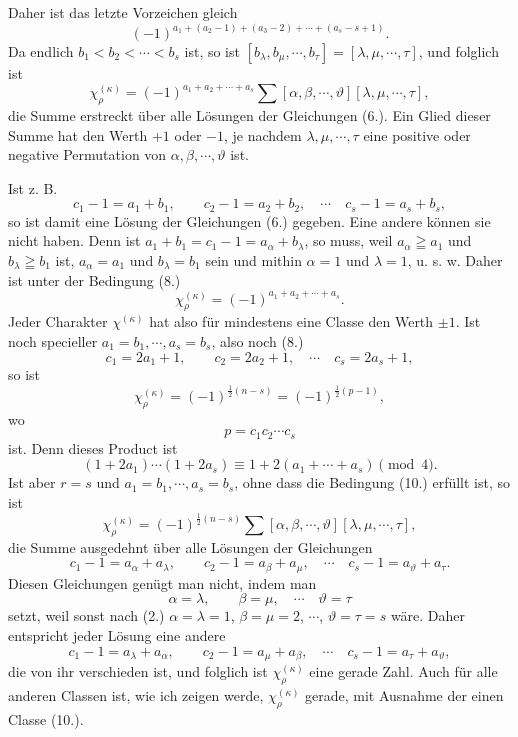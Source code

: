 \documentclass[11pt]{article}
\begin{document}
Daher ist das letzte Vorzeichen gleich
\[
 (-1)^{a_1+(a_2-1)+(a_3-2)+\cdots+(a_s-s+1)}.
\]
Da endlich $b_1<b_2<\cdots<b_s$ ist, so ist $[b_\lambda,b_\mu,
\cdots,b_\tau]=[\lambda,
\mu,
\cdots,
\tau]$, und folglich ist
\begin{equation}\tag{7.}
 \chi_\rho^{(\kappa)}=(-1)^{a_1+a_2+
\cdots+a_s}\sum[\alpha,
\beta,
\cdots,
\vartheta][\lambda,
\mu,
\cdots,
\tau],
\end{equation}
die Summe erstreckt über alle Lösungen der Gleichungen (6.). Ein Glied dieser Summe hat den Werth $+1$ oder $-1$, je nachdem $\lambda,
\mu,
\cdots,
\tau$ eine positive oder negative Permutation von $\alpha,
\beta,
\cdots,
\vartheta$ ist.

Ist z. B.
\begin{equation}\tag{8.}
 c_1-1=a_1+b_1,
\qquad c_2-1=a_2+b_2,
\quad\cdots\quad c_s-1=a_s+b_s,
\end{equation}
so ist damit eine Lösung der Gleichungen (6.) gegeben. Eine andere können sie nicht haben. Denn ist $a_1+b_1=c_1-1=a_\alpha+b_\lambda$, so muss, weil $a_\alpha\geqq a_1$ und $b_\lambda\geqq b_1$ ist, $a_\alpha=a_1$ und $b_\lambda=b_1$ sein und mithin $\alpha=1$ und $\lambda=1$, u. s. w. Daher ist unter der Bedingung (8.)
\begin{equation}\tag{9.}
 \chi_\rho^{(\kappa)}=(-1)^{a_1+a_2+
\cdots+a_s}.
\end{equation}
Jeder Charakter $\chi^{(\kappa)}$ hat also für mindestens eine Classe den Werth $\pm1$. Ist noch specieller $a_1=b_1,
\cdots,a_s=b_s$, also noch (8.)
\begin{equation}\tag{10.}
 c_1=2a_1+1,
\qquad c_2=2a_2+1,
\quad\cdots\quad c_s=2a_s+1,
\end{equation}
so ist
\begin{equation}\tag{11.}
 \chi_\rho^{(\kappa)}=(-1)^{\frac12(n-s)}=(-1)^{\frac12(p-1)},
\end{equation}
wo
\begin{equation}\tag{12.}
 p=c_1c_2\cdots c_s
\end{equation}
ist. Denn dieses Product ist
\[
 (1+2a_1)\cdots(1+2a_s)\equiv 1+2(a_1+
\cdots+a_s)\pmod{4}.
\]
Ist aber $r=s$ und $a_1=b_1,
\cdots,a_s=b_s$, ohne dass die Bedingung (10.) erfüllt ist, so ist
\[
 \chi_\rho^{(\kappa)}=(-1)^{\frac12(n-s)}\sum[\alpha,
\beta,
\cdots,
\vartheta][\lambda,
\mu,
\cdots,
\tau],
\]
die Summe ausgedehnt über alle Lösungen der Gleichungen
\[
 c_1-1=a_\alpha+a_\lambda,
\qquad c_2-1=a_\beta+a_\mu,
\quad\cdots\quad c_s-1=a_\vartheta+a_\tau.
\]
Diesen Gleichungen genügt man nicht, indem man
\[
 \alpha=\lambda,
\qquad \beta=\mu,
\quad\cdots\quad \vartheta=\tau
\]
setzt, weil sonst nach (2.) $\alpha=
\lambda=1$, $\beta=
\mu=2$, $\cdots$, $\vartheta=
\tau=s$ wäre. Daher entspricht jeder Lösung eine andere
\[
 c_1-1=a_\lambda+a_\alpha,
\qquad c_2-1=a_\mu+a_\beta,
\quad\cdots\quad c_s-1=a_\tau+a_\vartheta,
\]
die von ihr verschieden ist, und folglich ist $\chi_\rho^{(\kappa)}$ eine gerade Zahl. Auch für alle anderen Classen ist, wie ich zeigen werde, $\chi_\rho^{(\kappa)}$ gerade, mit Ausnahme der einen Classe (10.).
\end{document}
